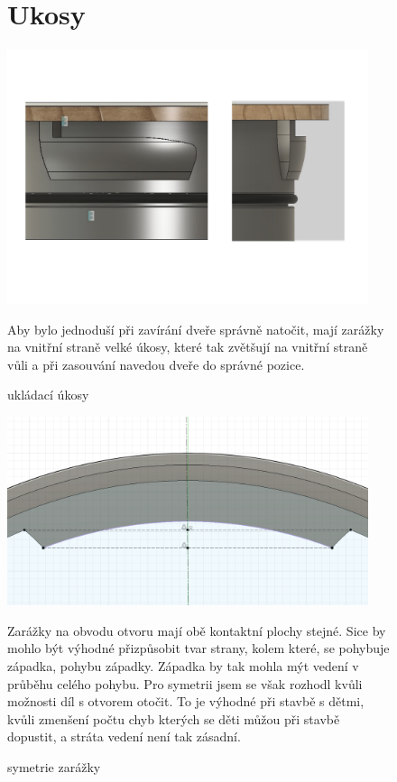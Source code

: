 
\begin{figure}[htbp]
    \section*{Ukosy}
    \centering
    \includegraphics[width=400]{kapitoly/obrazky/E4/ukozy/ukladaci_ukosy.pdf}
    \caption{ukládací úkosy}
    Aby bylo jednoduší při zavírání dveře správně natočit, mají zarážky na vnitřní straně velké úkosy, které tak zvětšují na vnitřní straně 
    vůli a při zasouvání navedou dveře do správné pozice.
    \label{fig:E4-ukosy}
\end{figure}

\begin{figure}[htbp]
    \centering
    \includegraphics[width=400]{kapitoly/obrazky/E4/ukozy/simetrie_zarazek.png}
    \caption{symetrie zarážky}
    Zarážky na obvodu otvoru mají obě kontaktní plochy stejné. Sice by mohlo být výhodné přizpůsobit tvar strany, kolem které, se pohybuje západka, 
    pohybu západky. Západka by tak mohla mýt vedení v průběhu celého pohybu. Pro symetrii jsem se však rozhodl kvůli možnosti díl s otvorem otočit.
    To je výhodné při stavbě s dětmi, kvůli zmenšení počtu chyb kterých se děti můžou při stavbě dopustit, a stráta vedení není tak zásadní.
    \label{fig:E4-simetrie_zarazky}
\end{figure}

\clearpage
\newpage